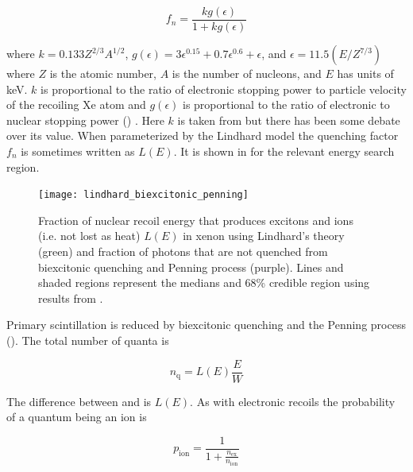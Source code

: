 \begin{equation}
f_{n} = \frac{k g(\epsilon)}{1 + k g(\epsilon)}
\label{eq:linhard_quenching}
\end{equation}

\noindent where $k = 0.133Z^{2/3}A^{1/2}$, $g(\epsilon) = 3\epsilon^{0.15} + 0.7\epsilon^{0.6} + \epsilon$, and
$\epsilon = 11.5 (E / Z^{7/3})$ where $Z$ is the atomic number, $A$ is the number of nucleons, and $E$ has units of keV.  $k$ is
proportional to the ratio of
electronic stopping power to particle velocity of the recoiling Xe atom  and $g(\epsilon)$ is proportional
to the ratio of electronic to nuclear stopping power () .  Here $k$ is taken
from  but there has been some debate over its value.  When parameterized by the Lindhard model the quenching factor
$f_{n}$ is sometimes written as $L(E)$.  It is shown in  for the relevant energy search region.

\begin{figure}
\texttt{[image: lindhard\_biexcitonic\_penning]}
\caption[Fraction of nuclear recoil energy that produces excitons and ions (i.e. not lost as heat) $L(E)$ in xenon using Lindhard's theory
and fraction of photons that are not quenched from biexcitonic quenching and Penning process.]{Fraction of nuclear recoil energy
that produces excitons and ions (i.e. not lost as heat) $L(E)$ in xenon using Lindhard's theory (green)
 and fraction of photons that are not quenched from biexcitonic quenching and Penning process (purple).  Lines and
shaded regions represent the medians and 68\% credible region using results from .}
\label{fig:lindhard}
\end{figure}

Primary scintillation is reduced by biexcitonic quenching and the Penning process ().  The total
number of quanta is

\begin{equation}
n_{\mathrm{q}} = L(E) \frac{E}{W}
\label{eq:nquant_nr}
\end{equation}

\noindent The difference between  and  is $L(E)$.  As with electronic recoils the probability
of a quantum being an ion is

\begin{equation}
p_{\mathrm{ion}} = \frac{1}{1 + \frac{ n_{\mathrm{ex}} }{ n_{\mathrm{ion}} }}
\end{equation}

